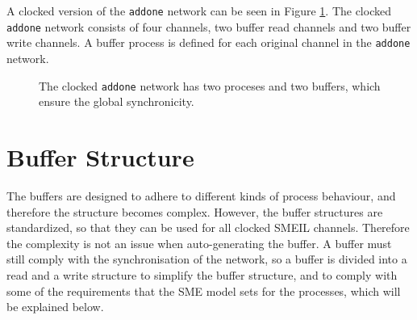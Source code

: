 A clocked version of the \texttt{addone} network can be seen in Figure \ref{fig:addone_clocked}. The clocked \texttt{addone} network consists of four channels, two buffer read channels and two buffer write channels. A buffer process is defined for each original channel in the \texttt{addone} network. \\

\begin{figure}
\centering
{}
\caption{The clocked \texttt{addone} network has two proceses and two buffers, which ensure the global synchronicity.}
\label{fig:addone_clocked}
\end{figure}
\section{Buffer Structure}
The buffers are designed to adhere to different kinds of process behaviour, and therefore the structure becomes complex. However, the buffer structures are standardized, so that they can be used for all clocked SMEIL channels. Therefore the complexity is not an issue when auto-generating the buffer. A buffer must still comply with the synchronisation of the network, so a buffer is divided into a read and a write structure to simplify the buffer structure, and to comply with some of the requirements that the SME model sets for the processes, which will be explained below. \\

